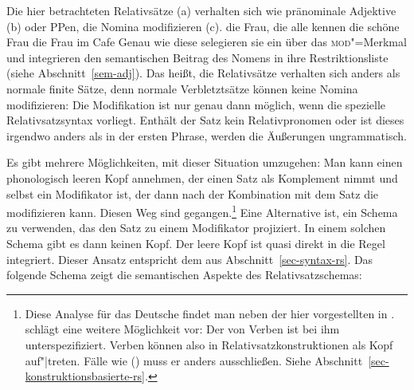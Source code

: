 Die hier betrachteten Relativsätze (a) verhalten sich wie pränominale
Adjektive (b) oder PPen, die Nomina modifizieren (c).
\eal
\ex die Frau, die alle kennen
\ex die schöne Frau
\ex die Frau im Cafe
\zl
Genau wie diese selegieren sie ein \nbar über das \textsc{mod}"=Merkmal und 
integrieren den semantischen Beitrag des Nomens in ihre Restriktionsliste (siehe Abschnitt~\ref{sem-adj}).
Das heißt, die Relativsätze verhalten sich anders als normale finite Sätze,
denn normale Verbletztsätze können keine Nomina modifizieren:
\eal
{}
\zl
Die Modifikation ist nur genau dann möglich, wenn die spezielle Relativsatzsyntax vorliegt.
Enthält der Satz kein Relativpronomen oder ist dieses irgendwo anders als in der ersten
Phrase, werden die Äußerungen ungrammatisch.

Es gibt mehrere Möglichkeiten, mit dieser Situation umzugehen: Man kann
einen phonologisch leeren Kopf annehmen, der einen Satz als Komplement nimmt 
und selbst ein Modifikator ist, der dann nach der Kombination mit dem Satz
die \nbar modifizieren kann. Diesen Weg sind \citet[Kapitel~5]{ps2} gegangen.\footnote{
  Diese Analyse für das Deutsche findet man neben der hier vorgestellten in .
  \citet{Sag97a} schlägt eine weitere Möglichkeit vor: Der \modw von Verben ist
  bei ihm unterspezifiziert. Verben können also in Relativsatzkonstruktionen
  als Kopf auf"|treten. Fälle wie () muss er anders ausschließen. Siehe Abschnitt~\ref{sec-konstruktionsbasierte-rs}.%
}
Eine Alternative ist, ein Schema zu verwenden, das den Satz
zu einem Modifikator projiziert. In einem solchen Schema gibt es dann keinen
Kopf. Der leere Kopf ist quasi direkt in die Regel integriert. Dieser Ansatz entspricht dem aus Abschnitt~\ref{sec-syntax-rs}.
Das folgende
Schema zeigt die semantischen Aspekte des Relativsatzschemas:


